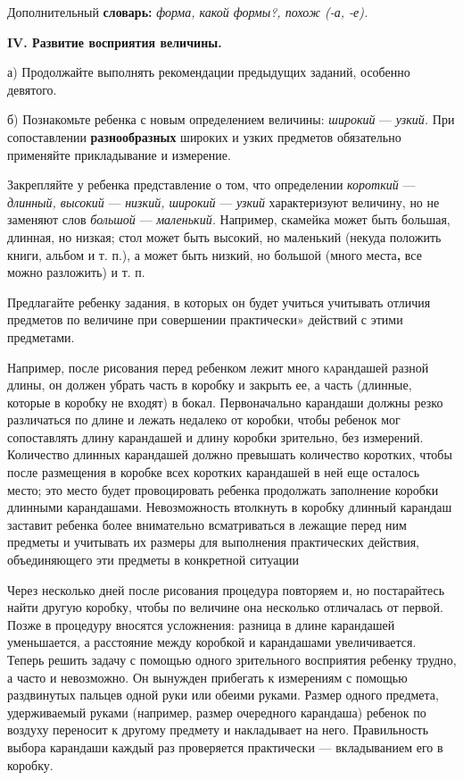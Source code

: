 \documentclass[a5paper]{book}
\renewcommand{\emph}[1]{\textit{#1}}
\begin{document}
Дополнительный \textbf{словарь:} \emph{форма, какой формы?, похож (-а,
-е).}

\textbf{IV. Развитие восприятия величины.}

а) Продолжайте выполнять рекомендации предыдущих заданий, особенно
девятого.

б) Познакомьте ребенка с новым определением величины: \emph{широкий} ---
\emph{узкий.} При сопоставлении \textbf{разнообразных} широких и узких
предметов обязательно применяйте прикладывание и измерение.

Закрепляйте у ребенка представление о том, что определении
\emph{короткий} --- \emph{длинный, высокий} --- \emph{низкий, широкий}
--- \emph{узкий} характеризуют величину, но не заменяют слов
\emph{большой} --- \emph{маленький.} Например, скамейка может быть
большая, длинная, но низкая; стол может быть высокий, но маленький
(некуда положить книги, альбом и т. п.), а может быть низкий, но большой
(много места\textbf{,} все можно разложить) и т. п.

Предлагайте ребенку задания, в которых он будет учиться учитывать
отличия предметов по величине при совершении практически» действий с
этими предметами.

Например, после рисования перед ребенком лежит много \textsc{ка}рандашей
разной длины, он должен убрать часть в коробку и закрыть ее, а часть
(длинные, которые в коробку не входят) в бокал. Первоначально карандаши
должны резко различаться по длине и лежать недалеко от коробки, чтобы
ребенок мог сопоставлять длину карандашей и длину коробки зрительно, без
измерений. Количество длинных карандашей должно превышать количество
коротких, чтобы после размещения в коробке всех коротких карандашей в
ней еще осталось место; это место будет провоцировать ребенка продолжать
заполнение коробки длинными карандашами. Невозможность втолкнуть в
коробку длинный карандаш заставит ребенка более внимательно
всматриваться в лежащие перед ним предметы и учитывать их размеры для
выполнения практических действия, объединяющего эти предметы в
конкретной ситуации

Через несколько дней после рисования процедура повторяем и, но
постарайтесь найти другую коробку, чтобы по величине она несколько
отличалась от первой. Позже в процедуру вносятся усложнения: разница в
длине карандашей уменьшается, а расстояние между коробкой и карандашами
увеличивается. Теперь решить задачу с помощью одного зрительного
восприятия ребенку трудно, а часто и невозможно. Он вынужден прибегать к
измерениям с помощью раздвинутых пальцев одной руки или обеими руками.
Размер одного предмета, удерживаемый руками (например, размер очередного
карандаша) ребенок по воздуху переносит к другому предмету и накладывает
на него. Правильность выбора карандаши каждый раз проверяется
практически --- вкладыванием его в коробку.
\end{document}
